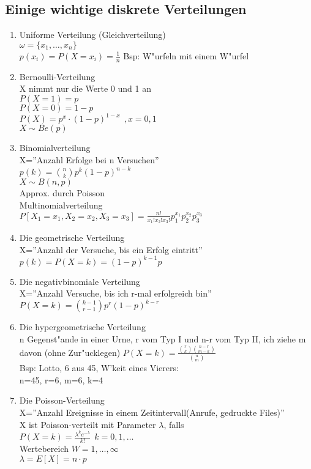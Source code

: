 \documentclass[10pt, a4paper, twocolumn]{scrartcl}
\begin{document}
\subsection{Einige wichtige diskrete Verteilungen}

\begin{enumerate}
 \item Uniforme Verteilung (Gleichverteilung)\\
  $\omega=\{x_1,\ldots,x_n\}$\\
  $p(x_i)=P(X=x_i)=\frac{1}{n}$
  Bsp: W"urfeln mit einem W"urfel
 \item Bernoulli-Verteilung\\
  X nimmt nur die Werte 0 und 1 an\\
  $P(X=1)=p$\\
  $P(X=0)=1-p$\\
  $P(X)=p^x\cdotp(1-p)^{1-x}\:\:,x=0,1$\\
  $X\sim Be(p)$
 \item Binomialverteilung\\
  X=''Anzahl Erfolge bei n Versuchen''\\
  $p(k)=\binom{n}{k}p^k(1-p)^{n-k}$\\
  $X\sim B(n,p)$\\
  Approx. durch Poisson\\
  Multinomialverteilung\\
  \scriptsize $P[X_1=x_1,X_2=x_2,X_3=x_3]=\frac{n!}{x_1!x_2!x_3!}p_1^{x_1}p_2^{x_2}p_3^{x_3}$\normalsize
 \item Die geometrische Verteilung\\
  X=''Anzahl der Versuche, bis ein Erfolg eintritt''\\
  $p(k)=P(X=k)=(1-p)^{k-1}p$
 \item Die negativbinomiale Verteilung\\
  X=''Anzahl Versuche, bis ich r-mal erfolgreich bin''\\
  $P(X=k)=\binom{k-1}{r-1}p^r(1-p)^{k-r}$
 \item Die hypergeometrische Verteilung\\
  n Gegenst"ande in einer Urne, r vom Typ I und n-r vom Typ II, ich ziehe m davon (ohne Zur"ucklegen)
  $P(X=k)=\frac{\binom{r}{k}\binom{n-r}{m-k}}{\binom{n}{m}}$\\
  Bsp: Lotto, 6 aus 45, W'keit eines Vierers:\\
  n=45, r=6, m=6, k=4
 \item Die Poisson-Verteilung\\
  X=''Anzahl Ereignisse in einem Zeitintervall(Anrufe, gedruckte Files)''\\
  X ist Poisson-verteilt mit Parameter $\lambda$, falls\\
  $P(X=k)=\frac{\lambda^k e^{-\lambda}}{k!}\:\:k=0,1,\ldots$\\
  Wertebereich $W={1,\ldots,\infty}$\\
  $\lambda=E[X]=n\cdotp p$
\end{enumerate}
\end{document}
